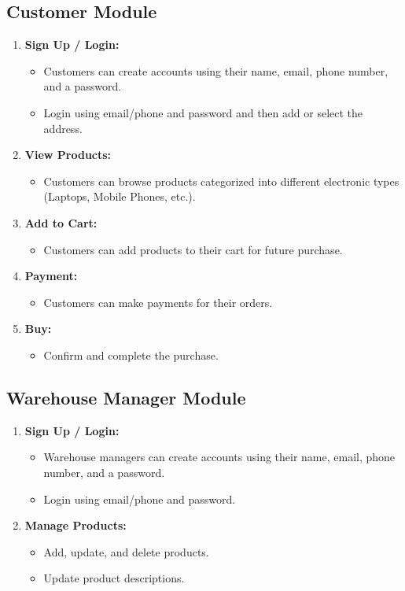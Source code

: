 \documentclass[12pt]{article}
\begin{document}
\subsection*{Customer Module}
\begin{enumerate}[label=\arabic*.]
    \item \textbf{Sign Up / Login:}
          \begin{itemize}
              \item Customers can create accounts using their name, email, phone number, and a password.
              \item Login using email/phone and password and then add or select the address.
          \end{itemize}
    \item \textbf{View Products:}
          \begin{itemize}
              \item Customers can browse products categorized into different electronic types (Laptops, Mobile Phones, etc.).
          \end{itemize}
    \item \textbf{Add to Cart:}
          \begin{itemize}
              \item Customers can add products to their cart for future purchase.
          \end{itemize}
    \item \textbf{Payment:}
          \begin{itemize}
              \item Customers can make payments for their orders.
          \end{itemize}
    \item \textbf{Buy:}
          \begin{itemize}
              \item Confirm and complete the purchase.
          \end{itemize}
\end{enumerate}

\subsection*{Warehouse Manager Module}
\begin{enumerate}[label=\arabic*.]
    \item \textbf{Sign Up / Login:}
          \begin{itemize}
              \item Warehouse managers can create accounts using their name, email, phone number, and a password.
              \item Login using email/phone and password.
          \end{itemize}
    \item \textbf{Manage Products:}
          \begin{itemize}
              \item Add, update, and delete products.
              \item Update product descriptions.
          \end{itemize}
\end{enumerate}
\end{document}
